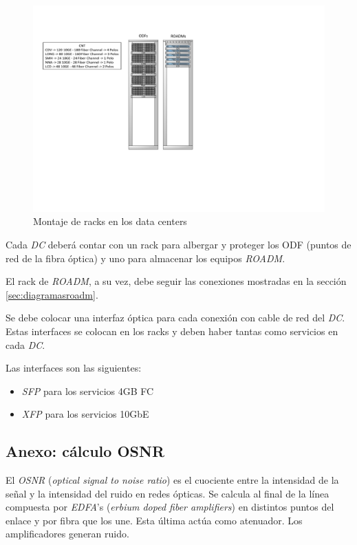 \begin{figure}[H]
  \centering
  \includegraphics[width=12cm]{Imagenes/racks3.pdf}
  \caption{Montaje de racks en los data centers}
  \label{fig:racks}
\end{figure}

Cada \emph{DC} deberá contar con un rack para albergar y proteger los
ODF (puntos de red de la fibra óptica) y uno para almacenar los
equipos \emph{ROADM}.

El rack de \emph{ROADM}, a su vez, debe seguir las conexiones
mostradas en la sección \ref{sec:diagramasroadm}.

Se debe colocar una interfaz óptica para cada conexión con cable de
red del \emph{DC}. Estas interfaces se colocan en los racks y deben haber
tantas como servicios en cada \emph{DC}.

Las interfaces son las siguientes:
\begin{itemize}
\item \emph{SFP} para los servicios 4GB FC
\item \emph{XFP} para los servicios 10GbE
\end{itemize}

\subsection{Anexo: cálculo OSNR}
\label{sec:osnr}

El \emph{OSNR} (\emph{optical signal to noise ratio}) es el cuociente
entre la intensidad de la señal y la intensidad del ruido en redes
ópticas. Se calcula al final de la línea compuesta por \emph{EDFA}'s
(\emph{erbium doped fiber amplifiers}) en distintos puntos del enlace
y por fibra que los une. Esta última actúa como atenuador. Los
amplificadores generan ruido.

